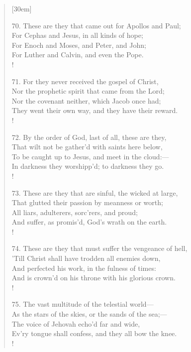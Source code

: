 \begin{verse}[30em]
\begin{altverse}
				70. These are they that came out for Apollos and Paul; \\ 
				For Cephas and Jesus, in all kinds of hope; \\ 
				For Enoch and Moses, and Peter, and John; \\ 
				For Luther and Calvin, and even the Pope. \\!
				 
				71. For they never received the gospel of Christ, \\ 
				Nor the prophetic spirit that came from the Lord; \\ 
				Nor the covenant neither, which Jacob once had; \\ 
				They went their own way, and they have their reward. \\!
				 
				72. By the order of God, last of all, these are they, \\ 
				That wilt not be gather'd with saints here below, \\ 
				To be caught up to Jesus, and meet in the cloud:--- \\ 
				In darkness they worshipp'd; to darkness they go. \\!
				 
				73. These are they that are sinful, the wicked at large, \\ 
				That glutted their passion by meanness or worth; \\ 
				All liars, adulterers, sorc'rers, and proud; \\ 
				And suffer, as promis'd, God's wrath on the earth. \\! 
				 
				74. These are they that must suffer the vengeance of hell, \\ 
				'Till Christ shall have trodden all enemies down, \\ 
				And perfected his work, in the fulness of times: \\ 
				And is crown'd on his throne with his glorious crown. \\!
				 
				75. The vast multitude of the telestial world--- \\ 
				As the stars of the skies, or the sands of the sea;--- \\ 
				The voice of Jehovah echo'd far and wide, \\ 
				Ev'ry tongue shall confess, and they all bow the knee. \\! 
				 

\end{altverse}
\end{verse}
